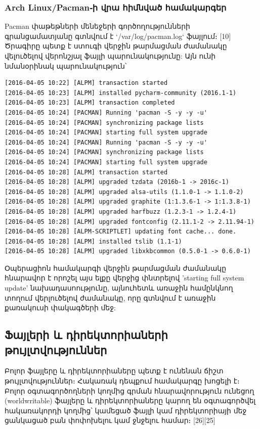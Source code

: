 \documentclass[a4paper,12pt]{article}
\begin{document}
\begin{sloppypar}
\subsubsection{Arch Linux/Pacman֊ի վրա հիմնված համակարգեր}

Pacman փաթեթների մենեջերի գործողությունների գրանցամատյանը
գտնվում է `/var/log/pacman.log` ֆայլում։ [10] Ծրագիրը պետք է ստուգի
վերջին թարմացման ժամանակը վելուծելով վերոնշյալ ֆայլի պարունակությունը:
Այն ունի նմանօրինակ պարունակություն՝

\begin{lstlisting}[language={}]
[2016-04-05 10:22] [ALPM] transaction started
[2016-04-05 10:23] [ALPM] installed pycharm-community (2016.1-1)
[2016-04-05 10:23] [ALPM] transaction completed
[2016-04-05 10:24] [PACMAN] Running 'pacman -S -y -y -u'
[2016-04-05 10:24] [PACMAN] synchronizing package lists
[2016-04-05 10:24] [PACMAN] starting full system upgrade
[2016-04-05 10:24] [PACMAN] Running 'pacman -S -y -y -u'
[2016-04-05 10:24] [PACMAN] synchronizing package lists
[2016-04-05 10:24] [PACMAN] starting full system upgrade
[2016-04-05 10:28] [ALPM] transaction started
[2016-04-05 10:28] [ALPM] upgraded tzdata (2016b-1 -> 2016c-1)
[2016-04-05 10:28] [ALPM] upgraded alsa-utils (1.1.0-1 -> 1.1.0-2)
[2016-04-05 10:28] [ALPM] upgraded graphite (1:1.3.6-1 -> 1:1.3.8-1)
[2016-04-05 10:28] [ALPM] upgraded harfbuzz (1.2.3-1 -> 1.2.4-1)
[2016-04-05 10:28] [ALPM] upgraded fontconfig (2.11.1-2 -> 2.11.94-1)
[2016-04-05 10:28] [ALPM-SCRIPTLET] updating font cache... done.
[2016-04-05 10:28] [ALPM] installed tslib (1.1-1)
[2016-04-05 10:28] [ALPM] upgraded libxkbcommon (0.5.0-1 -> 0.6.0-1)
\end{lstlisting}

Օպերացիոն համակարգի վերջին թարմացման ժամանակը հնարավոր է որոշել
այս ելքը վերջից փնտրելով 'starting full system update' նախադասոությունը,
այնուհետև առաջին համընկնող տողում վերլուծելով ժամանակը, որը գտնվում է
առաջին քառակուսի փակագծերի մեջ:


\subsection{Ֆայլերի և դիրեկտորիաների թույլտվություններ}


Բոլոր ֆայլերը և դիրեկտորիաները պետք է ունենան ճիշտ թույլտվություններ։
Հակառակ դեպքում համակարգը խոցելի է։
Բոլոր օգտագործողների կողմից գրման հնարավորություն ունեցող (worldwritable)
ֆայլերը և դիրեկտորիաները կարող են օգտագործվել հակառակորդի կողմից՝
կամեցած ֆայլի կամ դիրեկտորիայի մեջ ցանկացած բան փոփոխելու կամ ջնջելու
համար։ [26][25]


\end{sloppypar}
\end{document}
